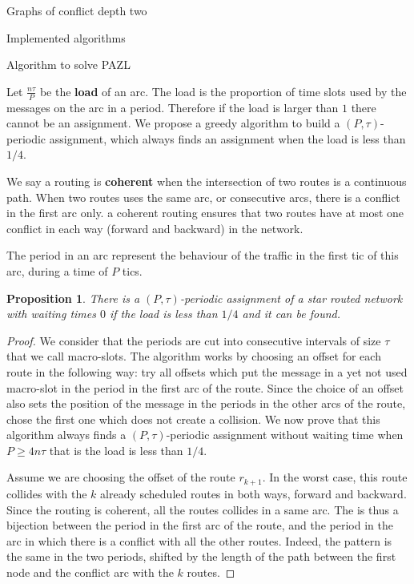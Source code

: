 \documentclass[10pt]{article}
\newtheorem{proposition}{Proposition}
\begin{document}
\begin{section}{Graphs of conflict depth two}
\begin{subsection}{Implemented algorithms}
  \begin{subsubsection}{Algorithm to solve PAZL }

 Let $\frac{n\tau}{P}$ be the \textbf{load} of an arc. The load is the proportion of time slots used by the messages on the arc in a period. Therefore if the load is larger than $1$ there cannot be an assignment. We propose a greedy algorithm to build a $(P,\tau)$-periodic assignment, which always finds an assignment when the load is less than $1/4$.
 
 We say a routing is \textbf{coherent} when the intersection of two routes is a continuous path. When two routes uses the same arc, or consecutive arcs, there is a conflict in the first arc only. a coherent routing ensures that two routes have at most one conflict in each way (forward and backward) in the network.
 
 The period in an arc represent the behaviour of the traffic in the first tic of this arc, during a time of $P$ tics.
    
    \begin{proposition}
    There is a $(P,\tau)$-periodic assignment of a star routed network with waiting times $0$ if the load is less than $1/4$ and it can be found.
    \end{proposition}
    \begin{proof}
     We consider that the periods are cut into consecutive intervals of size $\tau$ that we call macro-slots. The algorithm works by choosing an offset for each route in the following way: try all offsets which put the message in a yet not used macro-slot in the period in the first arc of the route. Since the choice of an offset also sets the position of the message in the  periods in the other arcs of the route, chose the first one which does not create a collision. We now prove that this algorithm always finds a $(P,\tau)$-periodic assignment without waiting time when $P \geq 4n\tau$ that is the load is less than $1/4$.
     
     Assume we are choosing the offset of the route $r_{k+1}$.
     In the worst case, this route collides with the $k$ already scheduled routes in both ways, forward and backward.
     Since the routing is coherent, all the routes collides in a same arc.
     The is thus a bijection between the period in the first arc of the route, and the period in the arc in which there is a conflict with all the other routes. Indeed, the pattern is the same in the two periods, shifted by the length of the path between the first node and the conflict arc with the $k$ routes.
     

\end{proof}
\end{subsubsection}
\end{subsection}
\end{section}
\end{document}
